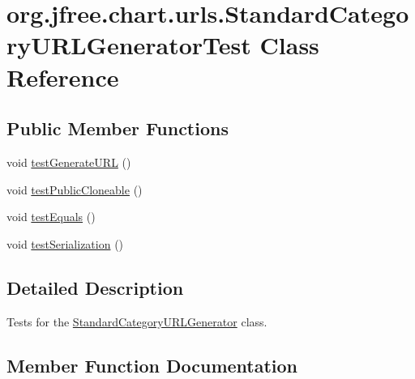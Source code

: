 \hypertarget{classorg_1_1jfree_1_1chart_1_1urls_1_1_standard_category_u_r_l_generator_test}{}\section{org.\+jfree.\+chart.\+urls.\+Standard\+Category\+U\+R\+L\+Generator\+Test Class Reference}
\label{classorg_1_1jfree_1_1chart_1_1urls_1_1_standard_category_u_r_l_generator_test}
\subsection*{Public Member Functions}
\begin{DoxyCompactItemize}
\item 
void \mbox{\hyperlink{classorg_1_1jfree_1_1chart_1_1urls_1_1_standard_category_u_r_l_generator_test_a6f0a3c3b3982799ee871bd05755be1b8}{test\+Generate\+U\+RL}} ()
\item 
void \mbox{\hyperlink{classorg_1_1jfree_1_1chart_1_1urls_1_1_standard_category_u_r_l_generator_test_adfa7d1658713e1fe166cac7fdd5b4ec5}{test\+Public\+Cloneable}} ()
\item 
void \mbox{\hyperlink{classorg_1_1jfree_1_1chart_1_1urls_1_1_standard_category_u_r_l_generator_test_a06779f8768128a031241fbbd6ea67e45}{test\+Equals}} ()
\item 
void \mbox{\hyperlink{classorg_1_1jfree_1_1chart_1_1urls_1_1_standard_category_u_r_l_generator_test_a0b5249843e0f88af7cc4c06e9a070829}{test\+Serialization}} ()
\end{DoxyCompactItemize}


\subsection{Detailed Description}
Tests for the \mbox{\hyperlink{classorg_1_1jfree_1_1chart_1_1urls_1_1_standard_category_u_r_l_generator}{Standard\+Category\+U\+R\+L\+Generator}} class. 

\subsection{Member Function Documentation}
\mbox{\label{classorg_1_1jfree_1_1chart_1_1urls_1_1_standard_category_u_r_l_generator_test_a06779f8768128a031241fbbd6ea67e45}} 
